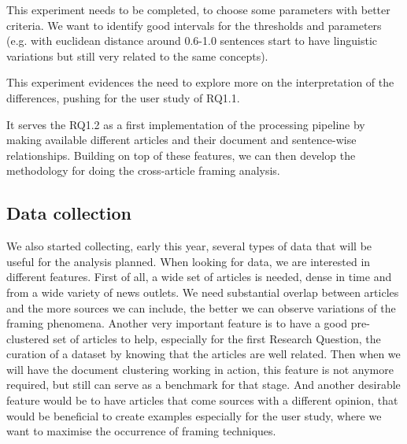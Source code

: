 This experiment needs to be completed, to choose some parameters with better criteria. We want to identify good intervals for the thresholds and parameters (e.g. with euclidean distance around 0.6-1.0 sentences start to have linguistic variations but still very related to the same concepts).

This experiment evidences the need to explore more on the interpretation of the differences, pushing for the user study of RQ1.1.

It serves the RQ1.2 as a first implementation of the processing pipeline by making available different articles and their document and sentence-wise relationships. Building on top of these features, we can then develop the methodology for doing the cross-article framing analysis.




\subsection{Data collection}
We also started collecting, early this year, several types of data that will be useful for the analysis planned.
When looking for data, we are interested in different features.
First of all, a wide set of articles is needed, dense in time and from a wide variety of news outlets. We need substantial overlap between articles and the more sources we can include, the better we can observe variations of the framing phenomena.
Another very important feature is to have a good pre-clustered set of articles to help, especially for the first Research Question, the curation of a dataset by knowing that the articles are well related. Then when we will have the document clustering working in action, this feature is not anymore required, but still can serve as a benchmark for that stage.
And another desirable feature would be to have articles that come sources with a different opinion, that would be beneficial to create examples especially for the user study, where we want to maximise the occurrence of framing techniques. 

